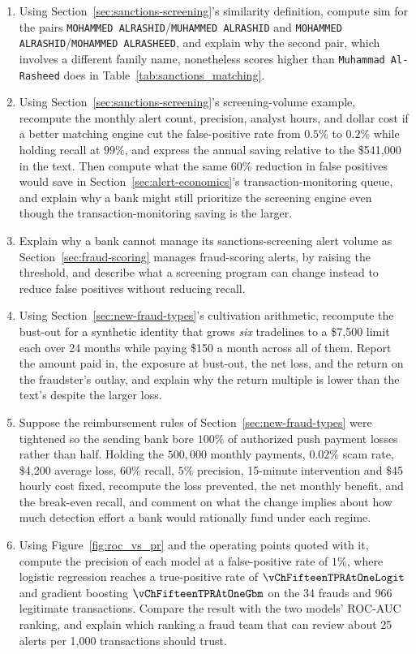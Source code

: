 \documentclass[../ai_in_finance]{subfiles}
\begin{document}
\begin{enumerate}[exercises]
    \item Using Section~\ref{sec:sanctions-screening}'s similarity definition, compute $\text{sim}$ for the pairs \texttt{MOHAMMED ALRASHID}/\texttt{MUHAMMED ALRASHID} and \texttt{MOHAMMED ALRASHID}/\texttt{MOHAMMED ALRASHEED}, and explain why the second pair, which involves a different family name, nonetheless scores higher than \texttt{Muhammad Al-Rasheed} does in Table~\ref{tab:sanctions_matching}.
    \item Using Section~\ref{sec:sanctions-screening}'s screening-volume example, recompute the monthly alert count, precision, analyst hours, and dollar cost if a better matching engine cut the false-positive rate from $0.5\%$ to $0.2\%$ while holding recall at $99\%$, and express the annual saving relative to the \$541,000 in the text. Then compute what the same $60\%$ reduction in false positives would save in Section~\ref{sec:alert-economics}'s transaction-monitoring queue, and explain why a bank might still prioritize the screening engine even though the transaction-monitoring saving is the larger.
    \item Explain why a bank cannot manage its sanctions-screening alert volume as Section~\ref{sec:fraud-scoring} manages fraud-scoring alerts, by raising the threshold, and describe what a screening program can change instead to reduce false positives without reducing recall.
    \item Using Section~\ref{sec:new-fraud-types}'s cultivation arithmetic, recompute the bust-out for a synthetic identity that grows \emph{six} tradelines to a \$7,500 limit each over 24 months while paying \$150 a month across all of them. Report the amount paid in, the exposure at bust-out, the net loss, and the return on the fraudster's outlay, and explain why the return multiple is lower than the text's despite the larger loss.
    \item Suppose the reimbursement rules of Section~\ref{sec:new-fraud-types} were tightened so the sending bank bore $100\%$ of authorized push payment losses rather than half. Holding the $500{,}000$ monthly payments, $0.02\%$ scam rate, \$4,200 average loss, $60\%$ recall, $5\%$ precision, 15-minute intervention and \$45 hourly cost fixed, recompute the loss prevented, the net monthly benefit, and the break-even recall, and comment on what the change implies about how much detection effort a bank would rationally fund under each regime.
    \item Using Figure~\ref{fig:roc_vs_pr} and the operating points quoted with it, compute the precision of each model at a false-positive rate of $1\%$, where logistic regression reaches a true-positive rate of $\vChFifteenTPRAtOneLogit$ and gradient boosting $\vChFifteenTPRAtOneGbm$ on the 34 frauds and 966 legitimate transactions. Compare the result with the two models' ROC-AUC ranking, and explain which ranking a fraud team that can review about 25 alerts per 1,000 transactions should trust.

\end{enumerate}
\end{document}

